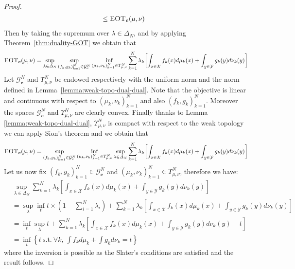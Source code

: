 \begin{proof}
\begin{align*}
  &\leq \textsc{EOT}_{\mathbf{c}}(\mu,\nu)
\end{align*}
Then by taking the supremum over $\lambda\in\Delta_N$, and by applying Theorem~\ref{thm:duality-GOT} we obtain that
\begin{align*}
\MOT_{\mathbf{c}}(\mu,\nu)
 =\sup_{\lambda\in \Delta_N} \sup\limits_{(f_k,g_k)_{k=1}^N\in  \mathcal{G}^{N}_{\mathbf{c}}} \inf_{(\mu_k,\nu_k)_{k=1}^N\in\Upsilon_{\mu,\nu}^N } \sum_{k=1}^N \lambda_k \left[\int_{x\in\mathcal{X}} f_k(x)d\mu_k(x)+ \int_{y\in\mathcal{Y}} g_k(y)d\nu_k(y)\right]
\end{align*}
Let $\mathcal{G}^{N}_{\mathbf{c}}$ and $\Upsilon_{\mu,\nu}^N$ be endowed respectively with the uniform norm and the norm defined in Lemma~\ref{lemma:weak-topo-dual-dual}. Note that the objective is linear and continuous with respect to $(\mu_k,\nu_k)_{k=1}^N$ and also $(f_k,g_k)_{k=1}^N$. Moreover the spaces $\mathcal{G}^{N}_{\mathbf{c}}$ and $\Upsilon_{\mu,\nu}^N$ are clearly convex. Finally thanks to Lemma \ref{lemma:weak-topo-dual-dual}, $\Upsilon_{\mu,\nu}^N$ is compact with respect to the weak topology we can apply Sion's theorem \cite{sion1958general} and we obtain that
\begin{align*}
\MOT_{\mathbf{c}}(\mu,\nu)
 = \sup\limits_{(f_k,g_k)_{k=1}^N\in  \mathcal{G}^{N}_{\mathbf{c}}} \inf_{(\mu_k,\nu_k)_{k=1}^N\in\Upsilon_{\mu,\nu}^N }\sup_{\lambda\in \Delta_N}  \sum_{k=1}^N \lambda_k \left[\int_{x\in\mathcal{X}} f_k(x)d\mu_k(x)+ \int_{y\in\mathcal{Y}} g_k(y)d\nu_k(y)\right]
\end{align*}
Let us now fix $(f_k,g_k)_{k=1}^N\in  \mathcal{G}^{N}_{\mathbf{c}}$ and $(\mu_k,\nu_k)_{k=1}^N\in\Upsilon_{\mu,\nu}^N$, therefore we have:
\begin{align*}
    &\sup_{\lambda\in \Delta_N}  \sum_{k=1}^N \lambda_k \left[\int_{x\in\mathcal{X}} f_k(x)d\mu_k(x)+ \int_{y\in\mathcal{Y}} g_k(y)d\nu_k(y)\right] \\
    &=\sup_{\lambda}\inf_{t}  t\times\left(1-\sum_{i=1}^N \lambda_i \right) + \sum_{k=1}^N \lambda_k \left[\int_{x\in\mathcal{X}} f_k(x)d\mu_k(x)+ \int_{y\in\mathcal{Y}} g_k(y)d\nu_k(y)\right]\\
     &=\inf_{t} \sup_{\lambda} t + \sum_{k=1}^N \lambda_k \left[\int_{x\in\mathcal{X}} f_k(x)d\mu_k(x)+ \int_{y\in\mathcal{Y}} g_k(y)d\nu_k(y)- t\right]\\
     &= \inf_{t} \left\{t~\mathrm{ s.t.}~\forall k, ~ \int f_kd\mu_k+ \int g_kd\nu_k = t \right\}
\end{align*}
where the inversion is possible as the Slater's conditions are satisfied  and the result follows.
\end{proof}

